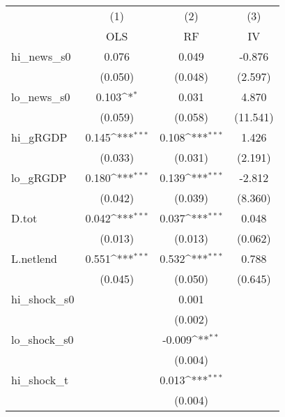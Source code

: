 {
\def\sym#1{\ifmmode^{#1}\else\(^{#1}\)\fi}
\begin{tabular}{l*{3}{c}}
\toprule
            &\multicolumn{1}{c}{(1)}&\multicolumn{1}{c}{(2)}&\multicolumn{1}{c}{(3)}\\
            &\multicolumn{1}{c}{OLS}&\multicolumn{1}{c}{RF}&\multicolumn{1}{c}{IV}\\
\midrule
hi\_news\_s0  &       0.076         &       0.049         &      -0.876         \\
            &     (0.050)         &     (0.048)         &     (2.597)         \\
\addlinespace
lo\_news\_s0  &       0.103\sym{*}  &       0.031         &       4.870         \\
            &     (0.059)         &     (0.058)         &    (11.541)         \\
\addlinespace
hi\_gRGDP    &       0.145\sym{***}&       0.108\sym{***}&       1.426         \\
            &     (0.033)         &     (0.031)         &     (2.191)         \\
\addlinespace
lo\_gRGDP    &       0.180\sym{***}&       0.139\sym{***}&      -2.812         \\
            &     (0.042)         &     (0.039)         &     (8.360)         \\
\addlinespace
D.tot       &       0.042\sym{***}&       0.037\sym{***}&       0.048         \\
            &     (0.013)         &     (0.013)         &     (0.062)         \\
\addlinespace
L.netlend   &       0.551\sym{***}&       0.532\sym{***}&       0.788         \\
            &     (0.045)         &     (0.050)         &     (0.645)         \\
\addlinespace
hi\_shock\_s0 &                     &       0.001         &                     \\
            &                     &     (0.002)         &                     \\
\addlinespace
lo\_shock\_s0 &                     &      -0.009\sym{**} &                     \\
            &                     &     (0.004)         &                     \\
\addlinespace
hi\_shock\_t  &                     &       0.013\sym{***}&                     \\
            &                     &     (0.004)         &                     \\

\end{tabular}}
